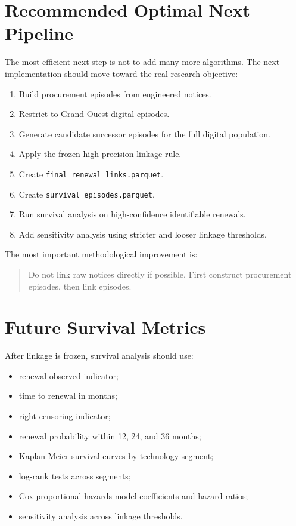 \documentclass[11pt,a4paper]{article}
\newcommand{\code}[1]{\texttt{#1}}
\begin{document}
\section*{Recommended Optimal Next Pipeline}

The most efficient next step is not to add many more algorithms. The next implementation should move toward the real research objective:

\begin{enumerate}
  \item Build procurement episodes from engineered notices.
  \item Restrict to Grand Ouest digital episodes.
  \item Generate candidate successor episodes for the full digital population.
  \item Apply the frozen high-precision linkage rule.
  \item Create \code{final\_renewal\_links.parquet}.
  \item Create \code{survival\_episodes.parquet}.
  \item Run survival analysis on high-confidence identifiable renewals.
  \item Add sensitivity analysis using stricter and looser linkage thresholds.
\end{enumerate}

The most important methodological improvement is:

\begin{quote}
Do not link raw notices directly if possible. First construct procurement episodes, then link episodes.
\end{quote}

\section*{Future Survival Metrics}

After linkage is frozen, survival analysis should use:

\begin{itemize}
  \item renewal observed indicator;
  \item time to renewal in months;
  \item right-censoring indicator;
  \item renewal probability within 12, 24, and 36 months;
  \item Kaplan-Meier survival curves by technology segment;
  \item log-rank tests across segments;
  \item Cox proportional hazards model coefficients and hazard ratios;
  \item sensitivity analysis across linkage thresholds.
\end{itemize}
\end{document}
